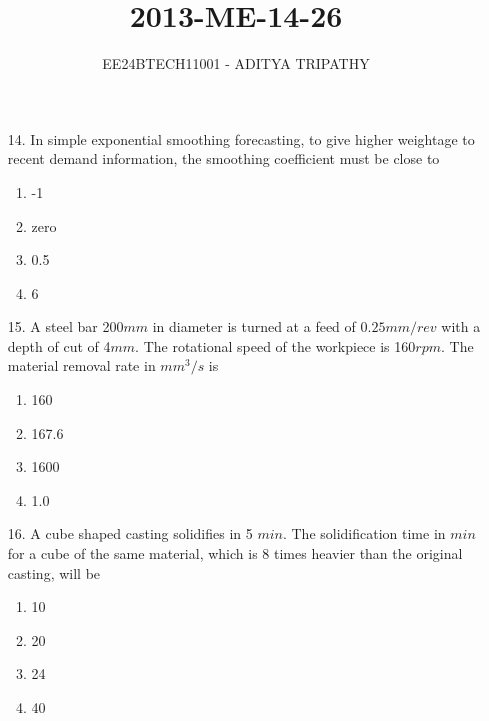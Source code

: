 \documentclass[journal,12pt,onecolumn]{IEEEtran}
\theoremstyle{remark}
\begin{document}

\vspace{3cm}

\title{2013-ME-14-26}
\author{EE24BTECH11001 -  ADITYA TRIPATHY}
\maketitle

\renewcommand{\thefigure}{\theenumi}
\renewcommand{\thetable}{\theenumi}

\begin{enumerate}
    \item[14.] 
        In simple exponential smoothing forecasting, to give higher weightage to recent demand
        information, the smoothing coefficient must be close to 
        \hfill{}
        \begin{multicols}{4}
            \begin{enumerate}
                \item -1
                    \columnbreak
                \item zero
                    \columnbreak
                \item 0.5
                    \columnbreak
                \item 6
            \end{enumerate}
        \end{multicols}

    \item[15.] A steel bar 200$mm$ in diameter is turned at a feed of $0.25 mm/rev$ with a depth of
        cut of 4$mm$. The rotational speed of the workpiece is 160$rpm$. The material removal rate
        in $mm^3 /s$ is
        \hfill{}
        \begin{multicols}{4}
            \begin{enumerate}
                \item 160 \columnbreak
                \item 167.6 \columnbreak
                \item 1600 \columnbreak
                \item 1.0
            \end{enumerate}
        \end{multicols}

    \item[16.] A cube shaped casting solidifies in 5 $min$. The solidification time in $min$
        for a cube of the same material, which is 8 times heavier than the original casting,
        will be
        \hfill{}
        \begin{multicols}{4}
        \begin{enumerate}
            \item 10 \columnbreak
            \item 20 \columnbreak
            \item 24 \columnbreak
            \item 40
        \end{enumerate}
\end{multicols}


\end{enumerate}
\end{document}
